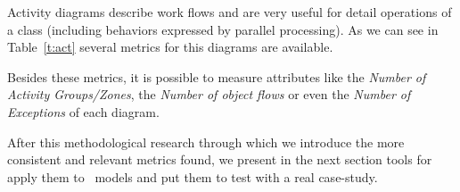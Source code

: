 Activity diagrams describe work flows and are very useful for detail operations of a class (including behaviors expressed by parallel processing).
As we can see in Table~\ref{t:act} several metrics for this diagrams are available.

Besides these metrics, it is possible to measure attributes like the \emph{Number of Activity Groups/Zones}, the \emph{Number of object flows} or even the \emph{Number of Exceptions} of each diagram.

After this methodological research through which we introduce the more consistent and relevant metrics found, we present in the next section tools for apply them to \uml\ models and put them to test with a real case-study.

